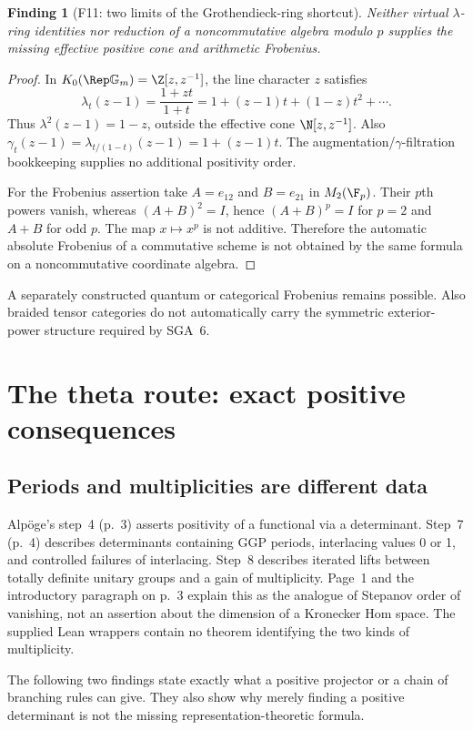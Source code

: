 \documentclass[11pt,a4paper]{article}
\newcommand{\fid}[1]{\textsf{#1}}\newcommand{\gate}[1]{\textsf{#1}}
\theoremstyle{named}\newtheorem{finding}{Finding}[section]
\theoremstyle{definition}\newtheorem{definition}[finding]{Definition}
\theoremstyle{remark}\newtheorem{remark}[finding]{Remark}
\begin{document}
\begin{finding}[\fid{F11}: two limits of the Grothendieck-ring shortcut]\label{f:lambda}
Neither virtual $\lambda$-ring identities nor reduction of a noncommutative algebra modulo $p$ supplies the missing effective positive cone and arithmetic Frobenius.
\end{finding}
\begin{proof}
In $K_0(\Rep\mathbb G_m)=\Z[z,z^{-1}]$, the line character $z$ satisfies
\[
 \lambda_t(z-1)=\frac{1+zt}{1+t}
 =1+(z-1)t+(1-z)t^2+\cdots.
\]
Thus $\lambda^2(z-1)=1-z$, outside the effective cone $\N[z,z^{-1}]$. Also
$\gamma_t(z-1)=\lambda_{t/(1-t)}(z-1)=1+(z-1)t$. The augmentation/\(\gamma\)-filtration bookkeeping supplies no additional positivity order.

For the Frobenius assertion take $A=e_{12}$ and $B=e_{21}$ in $M_2(\F_p)$. Their $p$th powers vanish, whereas $(A+B)^2=I$, hence $(A+B)^p=I$ for $p=2$ and $A+B$ for odd $p$. The map $x\mapsto x^p$ is not additive. Therefore the automatic absolute Frobenius of a commutative scheme is not obtained by the same formula on a noncommutative coordinate algebra.
\end{proof}
A separately constructed quantum or categorical Frobenius remains possible. Also braided tensor categories do not automatically carry the symmetric exterior-power structure required by SGA~6.

\section{The theta route: exact positive consequences}\label{sec:theta}
\subsection{Periods and multiplicities are different data}
Alp\"oge's step~4 (p.~3) asserts positivity of a functional via a determinant. Step~7 (p.~4) describes determinants containing GGP periods, interlacing values 0 or 1, and controlled failures of interlacing. Step~8 describes iterated lifts between totally definite unitary groups and a gain of multiplicity. Page~1 and the introductory paragraph on p.~3 explain this as the analogue of Stepanov order of vanishing, not an assertion about the dimension of a Kronecker Hom space. The supplied Lean wrappers contain no theorem identifying the two kinds of multiplicity.

The following two findings state exactly what a positive projector or a chain of branching rules can give. They also show why merely finding a positive determinant is not the missing representation-theoretic formula.
\end{document}
